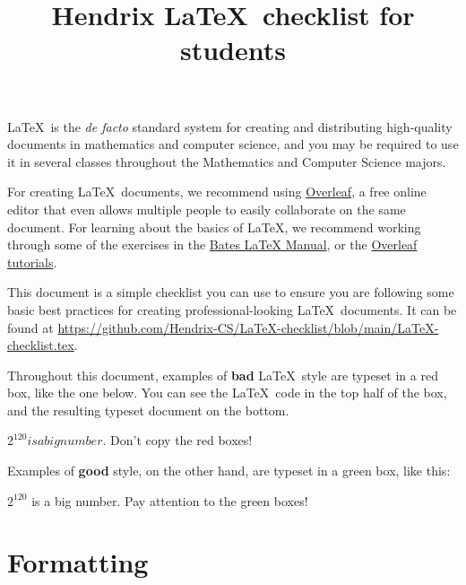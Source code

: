 \documentclass{article}
\title{Hendrix \protect\LaTeX\ checklist for students}
\begin{document}
\maketitle
\def\arraystretch{1.5}

\LaTeX\ is the \emph{de facto} standard system for creating and
distributing high-quality documents in mathematics and computer
science, and you may be required to use it in several classes
throughout the Mathematics and Computer Science majors.

For creating \LaTeX\ documents, we recommend using
\href{http://overleaf.com}{Overleaf}, a free online editor that even
allows multiple people to easily collaborate on the same document.
For learning about the basics of \LaTeX, we recommend working through
some of the exercises in the
\href{https://www.bates.edu/mathematics/resources/latex-manual/}{Bates
  LaTeX Manual}, or the \href{https://overleaf.com/learn/latex}{Overleaf
  tutorials}.

This document is a simple checklist you can use to ensure you are
following some basic best practices for creating professional-looking
\LaTeX\ documents.  It can be found at \url{https://github.com/Hendrix-CS/LaTeX-checklist/blob/main/LaTeX-checklist.tex}.

Throughout this document, examples of \textbf{bad} \LaTeX\ style are typeset in
a red box, like the one below.  You can see the \LaTeX\ code in the top half of
the box, and the resulting typeset document on the bottom.
\begin{bad}
$2^120 is a big number$.  Don't copy the red boxes!
\end{bad}

Examples of \textbf{good} style, on the other hand, are typeset in a green box,
like this:
\begin{good}
$2^{120}$ is a big number.  Pay attention to the green boxes!
\end{good}

\section*{Formatting}
\label{sec:formatting}
\end{document}
